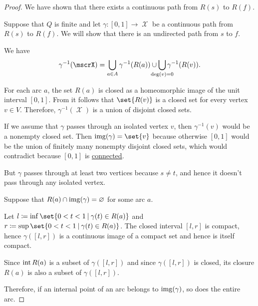 \begin{proof}
  We have shown that there exists a continuous path from \( R(s)  \) to \( R(f)  \).

   Suppose that \( Q \) is finite and let \( \gamma: [0, 1] \to \mscrX \) be a continuous path from \( R(s) \) to \( R(f) \). We will show that there is an undirected path from \( s \) to \( f \).

   We have
  \begin{equation}\label{eq:thm:quiver_geometric_realization_paths/full_preimage}
    \gamma^{-1}(\mscrX) = \bigcup_{a \in A} \gamma^{-1}(R(a)) \cup \bigcup_{\mathclap{\deg(v) = 0}} \gamma^{-1}(R(v)).
  \end{equation}

  For each arc \( a \), the set \( R(a) \) is closed as a homeomorphic image of the unit interval \( [0, 1] \). From  it follows that \( \set{ R(v) } \) is a closed set for every vertex \( v \in V \). Therefore, \( \gamma^{-1}(\mscrX) \) is a union of disjoint closed sets.

  If we assume that \( \gamma \) passes through an isolated vertex \( v \), then \( \gamma^{-1}(v) \) would be a nonempty closed set. Then \( \img(\gamma) = \set{ v } \) because otherwise \( [0, 1] \) would be the union of finitely many nonempty disjoint closed sets, which would contradict  because \( [0, 1] \) is \hyperref[def:connected_space]{connected}.

  But \( \gamma \) passes through at least two vertices because \( s \neq t \), and hence it doesn't pass through any isolated vertex.

   Suppose that \( R(a) \cap \operatorname{img}(\gamma) = \varnothing \) for some arc \( a \).

  Let \( l \coloneqq \inf\set{ 0 < t < 1 \given \gamma(t) \in R(a) } \) and \( r \coloneqq \sup\set{ 0 < t < 1 \given \gamma(t) \in R(a) } \). The closed interval \( [l, r] \) is compact, hence \( \gamma([l, r]) \) is a continuous image of a compact set and hence is itself compact.

  Since \( \operatorname{int} R(a) \) is a subset of \( \gamma([l, r]) \) and since \( \gamma([l, r]) \) is closed, its closure \( R(a) \) is also a subset of \( \gamma([l, r]) \).

  Therefore, if an internal point of an arc belongs to \( \operatorname{img}(\gamma) \), so does the entire arc.


\end{proof}
